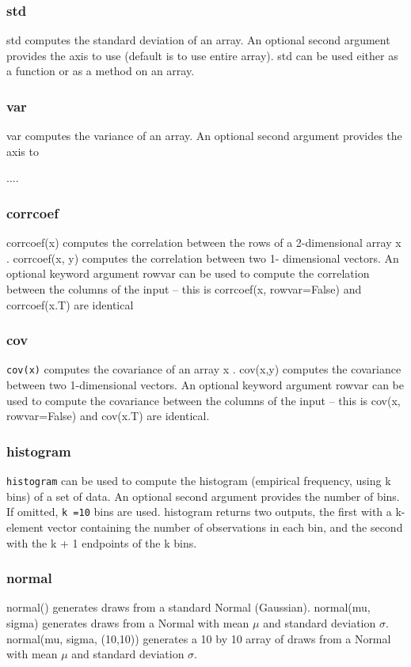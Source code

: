 \documentclass[KSmain.tex]{subfiles}
\begin{document}
\subsubsection{std}
std computes the standard deviation of an array. An optional second argument provides the axis to use
(default is to use entire array). std can be used either as a function or as a method on an array.
\subsubsection{var}
var computes the variance of an array. An optional second argument provides the axis to

....

\subsubsection{corrcoef}
corrcoef(x) computes the correlation between the rows of a 2-dimensional array x . corrcoef(x, y) computes
the correlation between two 1- dimensional vectors. An optional keyword argument rowvar can be
used to compute the correlation between the columns of the input – this is corrcoef(x, rowvar=False)
and corrcoef(x.T) are identical



\subsubsection{cov}
\texttt{cov(x)} computes the covariance of an array x . cov(x,y) computes the covariance between two 1-dimensional
vectors. An optional keyword argument rowvar can be used to compute the covariance between the
columns of the input – this is cov(x, rowvar=False) and cov(x.T) are identical.
\subsubsection{histogram}
\texttt{histogram} can be used to compute the histogram (empirical frequency, using k bins) of a set of data. An
optional second argument provides the number of bins. If omitted, \texttt{k =10} bins are used. histogram returns
two outputs, the first with a k-element vector containing the number of observations in each bin, and the
second with the k + 1 endpoints of the k bins.

\subsubsection{normal}
normal() generates draws from a standard Normal (Gaussian). normal(mu, sigma) generates draws from
a Normal with mean $\mu$ and standard deviation $\sigma$. normal(mu, sigma, (10,10)) generates a 10 by 10 array
of draws from a Normal with mean $\mu$ and standard deviation $\sigma$. 
\end{document}
